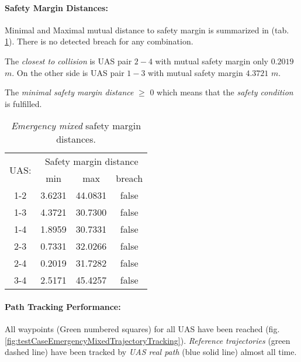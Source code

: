     \noindent\paragraph{Safety Margin Distances:} Minimal and Maximal mutual distance to safety margin is summarized in (tab. \ref{tab:testCaseEmergencyMixedSafetyMarginDistances}). There is no detected breach for any combination. 
    
    The \emph{closest to collision} is UAS pair $2-4$ with mutual safety margin only $0.2019$ $m$. On the other side is UAS pair $1-3$ with mutual safety margin $4.3721$ $m$. 
    
    The \emph{minimal safety margin distance}  $\ge$ 0 which means that the \emph{safety condition} is fulfilled. 
    
    \begin{table}[H]
        \centering
        \begin{tabular}{c||c|c|c}
            \multirow{2}{*}{UAS:} & \multicolumn{3}{c}{Safety margin distance} \\ \cline{2-4} 
                      & min          & max         & breach         \\ \hline\hline
                1-2   & 3.6231       & 44.0831     & false          \\ \hline
                1-3   & 4.3721       & 30.7300     & false          \\ \hline
                1-4   & 1.8959       & 30.7331     & false          \\ \hline
                2-3   & 0.7331       & 32.0266     & false          \\ \hline
                2-4   & 0.2019       & 31.7282     & false          \\ \hline
                3-4   & 2.5171       & 45.4257     & false          \\ 
        \end{tabular}
        \caption{\emph{Emergency mixed} safety margin distances.}
        \label{tab:testCaseEmergencyMixedSafetyMarginDistances}
    \end{table}
    
    \noindent\paragraph{Path Tracking Performance:} All waypoints (Green numbered squares) for all UAS have been reached (fig. \ref{fig:testCaseEmergencyMixedTrajectoryTracking}). \emph{Reference trajectories} (green dashed line) have been tracked by \emph{UAS real path} (blue solid line) almost all time. 
    
